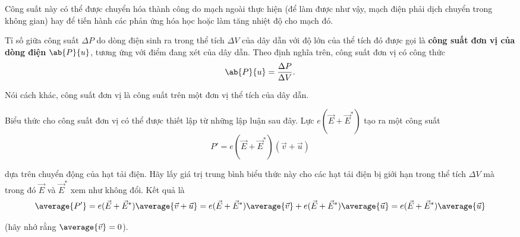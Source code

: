 \noindent
Công suất này có thể được chuyển hóa thành công do mạch ngoài thực hiện (để làm được như vậy, mạch điện phải dịch chuyển trong không gian) hay để tiến hành các phản ứng hóa học hoặc làm tăng nhiệt độ cho mạch đó.

Tỉ số giữa công suất $\Delta{P}$ do dòng điện sinh ra trong thể tích $\Delta{V}$ của dây dẫn với độ lớn của thể tích đó được gọi là \textbf{công suất đơn vị của dòng điện} $\ab{P}{u}$, tương ứng với điểm đang xét của dây dẫn. Theo định nghĩa trên, công suất đơn vị có công thức 
\begin{equation}\label{eq:5_34}
    \ab{P}{u} = \frac{\Delta{P}}{\Delta{V}}.
\end{equation}

\noindent
Nói cách khác, công suất đơn vị là công suất trên một đơn vị thể tích của dây dẫn.

Biểu thức cho công suất đơn vị có thể được thiết lập từ những lập luận sau đây. Lực $e(\vec{E}+\vec{E}^*)$ tạo ra một công suất
\begin{equation*}
    P' = e (\vec{E} + \vec{E}^*) (\vec{v} + \vec{u})
\end{equation*}

\noindent
dựa trên chuyển động của hạt tải điện. Hãy lấy giá trị trung bình biểu thức này cho các hạt tải điện bị giới hạn trong thể tích $\Delta{V}$ mà trong đó $\vec{E}$ và $\vec{E}^*$ xem như không đổi. Kết quả là
\begin{equation*}
    \average{P'} = e (\vec{E} + \vec{E}^*) \average{\vec{v} + \vec{u}} = e (\vec{E} + \vec{E}^*) \average{\vec{v}} + e (\vec{E} + \vec{E}^*) \average{\vec{u}} = e (\vec{E} + \vec{E}^*) \average{\vec{u}}
\end{equation*}

\noindent
(hãy nhớ rằng $\average{\vec{v}}=0$).

